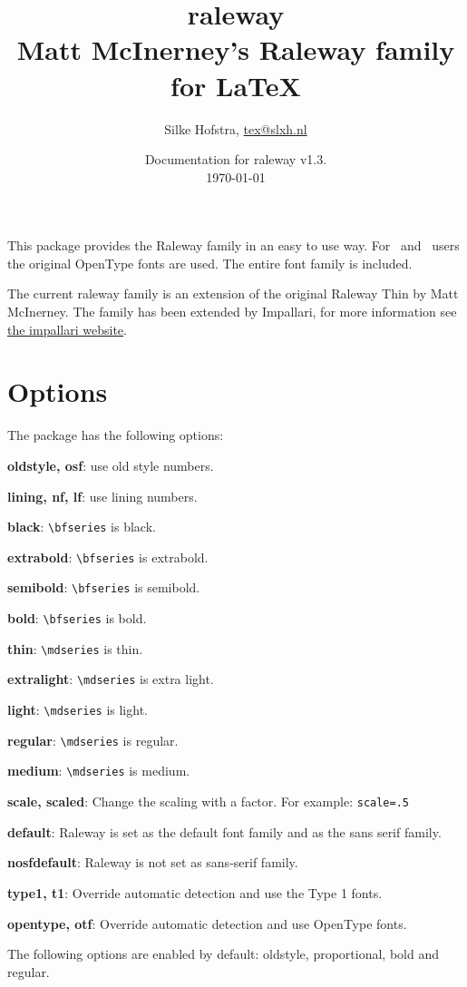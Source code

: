 \documentclass[10pt,a4paper,english]{article}
\title{\bfseries
	\Huge raleway\\
	\Large Matt McInerney’s Raleway family for \LaTeX
}
\author{Silke Hofstra, \href{mailto:tex@slxh.nl}{tex@slxh.nl}}
\date{Documentation for raleway v1.3.\\ \today}
\begin{document}
\maketitle
\begin{multicols}{2}
This package provides the Raleway family in an easy to use way. For \XeLaTeX\ and \LuaLaTeX\ users the original OpenType fonts are used. The entire font family is included.

The current raleway family is an extension of the original Raleway Thin by Matt McInerney. The family has been extended by Impallari, for more information see \href{http://www.impallari.com/projects/overview/matt-mcinerneys-raleway-family}{the impallari website}.

\section{Options}
The package has the following options:
\begin{itemize*}
	\item \textbf{oldstyle, osf}:  use old style numbers.
	\item \textbf{lining, nf, lf}: use lining numbers.
	\item \textbf{black}:          \texttt{\textbackslash bfseries} is black.
	\item \textbf{extrabold}:      \texttt{\textbackslash bfseries} is extrabold.
	\item \textbf{semibold}:       \texttt{\textbackslash bfseries} is semibold.
	\item \textbf{bold}:           \texttt{\textbackslash bfseries} is bold.
	\item \textbf{thin}:           \texttt{\textbackslash mdseries} is thin.
	\item \textbf{extralight}:     \texttt{\textbackslash mdseries} is extra light.
	\item \textbf{light}:          \texttt{\textbackslash mdseries} is light.
	\item \textbf{regular}:        \texttt{\textbackslash mdseries} is regular.
	\item \textbf{medium}:         \texttt{\textbackslash mdseries} is medium.
	\item \textbf{scale, scaled}:  Change the scaling with a factor. For example:  \texttt{scale=.5}
	\item \textbf{default}:        Raleway is set as the default font family and as the sans serif family.
	\item \textbf{nosfdefault}:    Raleway is not set as sans-serif family.
	\item \textbf{type1, t1}:      Override automatic detection and use the Type 1 fonts.
	\item \textbf{opentype, otf}:  Override automatic detection and use OpenType fonts.
\end{itemize*}
The following options are enabled by default: oldstyle, proportional, bold and regular.


\end{multicols}
\end{document}
